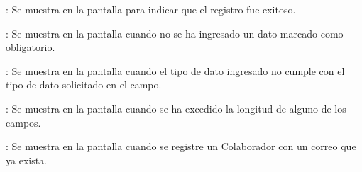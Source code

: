 \begin{Citemize}
	\item {}: Se muestra en la pantalla  para indicar que el registro fue exitoso.
	\item {}: Se muestra en la pantalla  cuando no se ha ingresado un dato marcado como obligatorio.
	\item {}: Se muestra en la pantalla  cuando el tipo de dato ingresado no cumple con el tipo de dato solicitado en el campo.
	\item {}: Se muestra en la pantalla  cuando se ha excedido la longitud de alguno de los campos.
	\item {}: Se muestra en la pantalla  cuando se registre un Colaborador con un correo que ya exista.
\end{Citemize}
